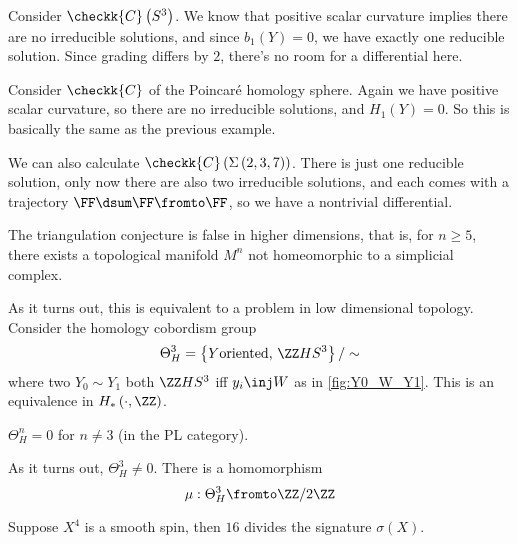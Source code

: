 \documentclass{amsart}
\begin{document}
\begin{exm}
Consider $\checkk{C}\left( S^3 \right)$. 
We know that positive scalar curvature implies there are no irreducible solutions, 
and since $b_1\left( Y \right) = 0$, we have exactly one reducible solution.
Since grading differs by $2$, there's no room for a differential here.
\end{exm}

\begin{exm}
Consider $\checkk{C}$ of the Poincar\'e homology 
sphere. Again we have positive scalar curvature, so there are no irreducible solutions, 
and $H_1\left( Y \right)= 0$. 
So this is basically the same as the previous example.
\end{exm}

\begin{exm}
We can also calculate $\checkk{C}\left( \Sigma\left( 2,3,7 \right) \right)$. 
There is just one reducible solution, only now there are also two irreducible solutions, 
and each comes with a trajectory $\FF\dsum \FF\fromto \FF$, 
so we have a nontrivial differential. 
\end{exm}

\begin{thm}[Manolescu]
The triangulation conjecture is false 
in higher dimensions, that is, for $n\geq 5$, there exists
a topological manifold $M^n$ not homeomorphic to a simplicial 
complex.
\end{thm}

As it turns out, this is equivalent to a problem in low dimensional topology.
Consider the homology cobordism group
\begin{equation}
\Theta_H^3 =
\left\{ Y \text{oriented, }\ZZ HS^3 \right\} / \sim
\end{equation}
where two $Y_0\sim Y_1$ both
$\ZZ HS^3$ iff $y_i \inj W$ as in 
\cref{fig:Y0_W_Y1}.
This is an equivalence in $H_*\left( \cdot , \ZZ \right)$.

\begin{rmk}
$\Theta_H^n = 0$ for $n\neq 3$ (in the PL category).
\end{rmk}

As it turns out, $\Theta_H^3 \neq 0$. 
There is a homomorphism 
\begin{equation}
\mu: \Theta_H^3\fromto \ZZ / 2\ZZ
\end{equation}

\begin{thm}[Rokhlin]
Suppose $X^4$ is a smooth spin,
then $16$ divides the signature $\sigma\left( X \right)$.
\label{thm:rokh}
\end{thm}
\end{document}
